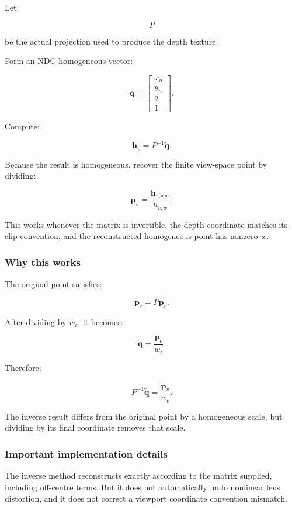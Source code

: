 Let:

\[ P \]

be the actual projection used to produce the depth texture.

Form an NDC homogeneous vector:

\[ \tilde{\mathbf q}= \begin{bmatrix} x_n\\y_n\\q\\1 \end{bmatrix}. \]

Compute:

\[ \boxed{ \mathbf h_v=P^{-1}\tilde{\mathbf q}. } \]

Because the result is homogeneous, recover the finite view-space point by dividing:

\[ \boxed{ \mathbf p_v=\frac{\mathbf h_{v,xyz}}{h_{v,w}}. } \]

This works whenever the matrix is invertible, the depth coordinate matches its clip convention, and the reconstructed homogeneous point has nonzero \(w\).

\subsubsection{Why this works}\label{why-this-works}

The original point satisfies:

\[ \mathbf p_c=P\tilde{\mathbf p}_v. \]

After dividing by \(w_c\), it becomes:

\[ \tilde{\mathbf q} = \frac{\mathbf p_c}{w_c}. \]

Therefore:

\[ P^{-1}\tilde{\mathbf q} = \frac{\tilde{\mathbf p}_v}{w_c}. \]

The inverse result differs from the original point by a homogeneous scale, but dividing by its final coordinate removes that scale.

\subsubsection{Important implementation details}\label{important-implementation-details}

The inverse method reconstructs exactly according to the matrix supplied, including off-centre terms. But it does not automatically undo nonlinear lens distortion, and it does not correct a viewport coordinate convention mismatch.

